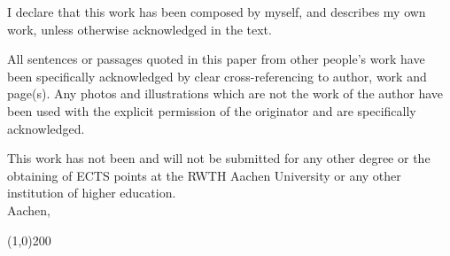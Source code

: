 \begin{declaration}

I declare that this work has been composed by myself, and describes my own work, unless otherwise acknowledged in the text. 

All sentences or passages quoted in this paper from other people's work have been specifically acknowledged by clear cross-referencing to author, work and 
page(s). Any photos and illustrations which are not the work of the author have been used with the explicit permission of the originator and are specifically acknowledged. 

This work has not been and will not be submitted for any other degree or the obtaining of ECTS points at the RWTH Aachen University or any other institution of higher education.\\[1em]

Aachen, \submitdate \\[2em]

\begin{flushright}
	\line(1,0){200}\\
	\autor
\end{flushright}


\end{declaration}

\cleardoublepage
